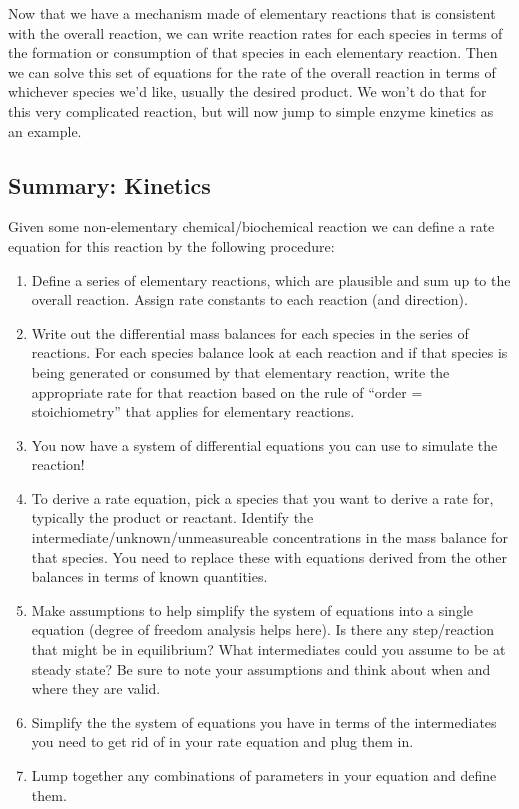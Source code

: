 \documentclass[
]{article}
\providecommand{\tightlist}{%
  \setlength{\itemsep}{0pt}\setlength{\parskip}{0pt}}
\begin{document}
Now that we have a mechanism made of elementary reactions that is consistent with the overall reaction, we can write reaction rates for each species in terms of the formation or consumption of that species in each elementary reaction. Then we can solve this set of equations for the rate of the overall reaction in terms of whichever species we'd like, usually the desired product. We won't do that for this very complicated reaction, but will now jump to simple enzyme kinetics as an example.

\hypertarget{summary-kinetics}{%
\subsection{Summary: Kinetics}\label{summary-kinetics}}

Given some non-elementary chemical/biochemical reaction we can define a rate equation for this reaction by the following procedure:

\begin{enumerate}
\def\labelenumi{\arabic{enumi})}
\tightlist
\item
  Define a series of elementary reactions, which are plausible and sum up to the overall reaction. Assign rate constants to each reaction (and direction).
\item
  Write out the differential mass balances for each species in the series of reactions. For each species balance look at each reaction and if that species is being generated or consumed by that elementary reaction, write the appropriate rate for that reaction based on the rule of ``order = stoichiometry'' that applies for elementary reactions.
\item
  You now have a system of differential equations you can use to simulate the reaction!
\item
  To derive a rate equation, pick a species that you want to derive a rate for, typically the product or reactant. Identify the intermediate/unknown/unmeasureable concentrations in the mass balance for that species. You need to replace these with equations derived from the other balances in terms of known quantities.
\item
  Make assumptions to help simplify the system of equations into a single equation (degree of freedom analysis helps here). Is there any step/reaction that might be in equilibrium? What intermediates could you assume to be at steady state? Be sure to note your assumptions and think about when and where they are valid.
\item
  Simplify the the system of equations you have in terms of the intermediates you need to get rid of in your rate equation and plug them in.
\item
  Lump together any combinations of parameters in your equation and define them.
\end{enumerate}
\end{document}
